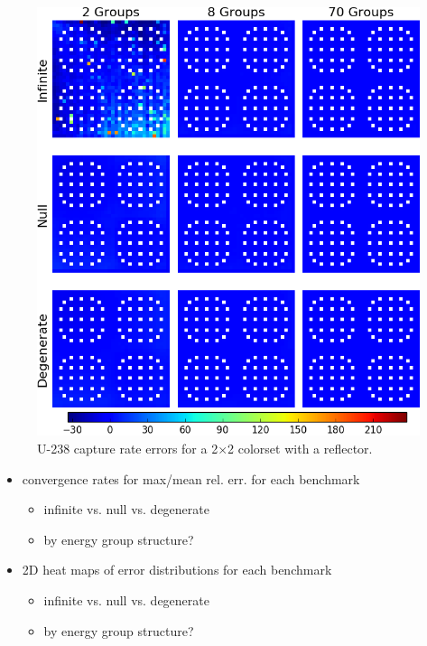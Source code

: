 \begin{figure}[h!]
\centering
\includegraphics[width=\linewidth]{figures/quantification/reflector/capt-err}
\caption[U-238 capture rate errors for a 2$\times$2 colorset with a reflector]{U-238 capture rate errors for a 2$\times$2 colorset with a reflector.}
\label{fig:chap8-reflector-capt-err}
\end{figure}


\begin{itemize}[noitemsep]
  \item convergence rates for max/mean rel. err. for each benchmark
  \begin{itemize}[noitemsep]
    \item infinite vs. null vs. degenerate
    \item by energy group structure?
  \end{itemize}
  \item 2D heat maps of error distributions for each benchmark
  \begin{itemize}[noitemsep]
    \item infinite vs. null vs. degenerate
    \item by energy group structure?
  \end{itemize}
\end{itemize}


